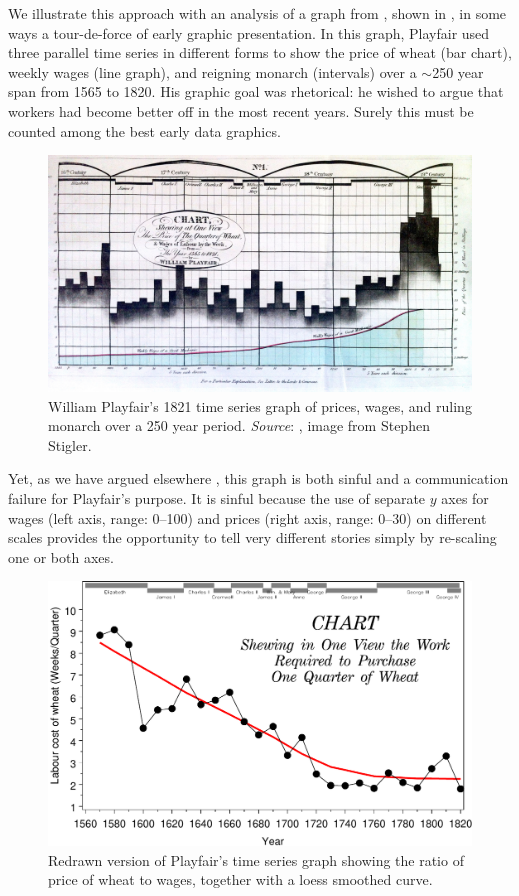 We illustrate this approach with an analysis of a graph from \citet{Playfair:1821},
shown in , in some ways a tour-de-force of
early graphic presentation. In this graph, Playfair used three parallel time
series in different forms
to show the price of wheat (bar chart), weekly wages (line graph), and reigning monarch (intervals)
over a $\sim$250 year span from 1565 to 1820. His graphic goal was rhetorical: he wished to
argue that workers had become better off in the most recent years. Surely this must be counted
among the best early data graphics.

\begin{figure}[htb]
  \centering
  \includegraphics[width=\textwidth]{fig/Playfair1821b}
  \caption{William Playfair's 1821 time series graph of prices, wages, and ruling monarch
  over a 250 year period.
  \emph{Source}: \cite{Playfair:1821}, image from Stephen Stigler.}%
  \label{fig:playfair-wheat1}
\end{figure}

Yet, as we have argued elsewhere \citep{FriendlyDenis:05:scat}, this graph is both sinful
and a communication failure for Playfair's purpose.  It is sinful because the use of separate $y$ axes for
wages (left axis, range: 0--100) and prices (right axis, range: 0--30) on different scales
provides the opportunity to tell very different stories simply by re-scaling one or both
axes.

\begin{figure}[!htb]
  \centering
  \includegraphics[width=.9\textwidth,clip]{fig/wheat1}
  \caption{Redrawn version of Playfair's time series graph
  showing the ratio of price of wheat to wages,
  together with a loess smoothed curve.}
  \label{fig:wheat1}
\end{figure}

